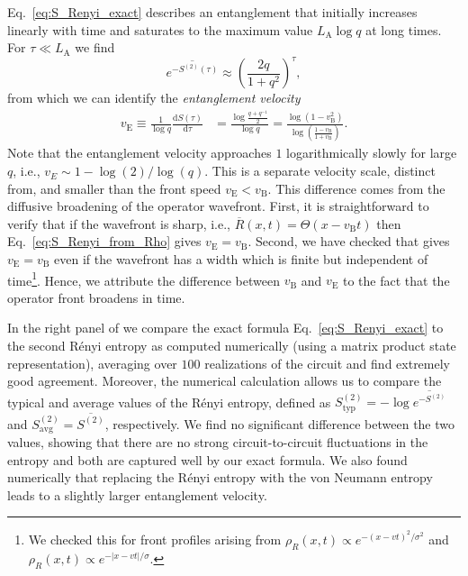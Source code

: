 \documentclass[aps,prb,twocolumn,superscriptaddress]{revtex4-1}
\begin{document}
Eq.~\eqref{eq:S_Renyi_exact} describes an entanglement that initially increases linearly with time and saturates to the maximum value $L_\text{A}\log{q}$ at long times. For $\tau \ll L_\text{A}$ we find
\begin{equation}
\overline{e^{-S^{(2)}(\tau)}} \approx \left( \frac{2q}{1+q^2} \right)^\tau,
\end{equation} 
from which we can identify the \emph{entanglement velocity}
\begin{align}\label{eq:entanglement_velocity}
v_\text{E} \equiv \frac{1}{\log{q}} \frac{\text{d}S(\tau)}{\text{d}\tau} &=\frac{\log \frac{q+q^{-1}}{2}}{\log q} = \frac{\log \left(1-v_{\text{B}}^2\right)}{\log \left(\frac{1-v_{\text{B}}}{1+v_{\text{B}}}\right)}.
\end{align}
Note that the entanglement velocity approaches $1$ logarithmically slowly for large $q$, i.e., $v_E\sim 1- \log(2)/\log(q)$. This is a separate velocity scale, distinct from, and smaller than the front speed $v_\text{E} <v_{\text{B}}$. This difference comes from the diffusive broadening of the operator wavefront.  First, it is straightforward to verify that if the wavefront is sharp, i.e., $\overline{R}(x,t) = \Theta(x-v_{\text{B}}t)$ then Eq.~\eqref{eq:S_Renyi_from_Rho}  gives $v_\text{E} = v_{\text{B}}$. Second, we have checked that  gives $v_\text{E} = v_{\text{B}}$ even if the wavefront has a width which is finite but independent of time\footnote{We checked this for front profiles arising from $\rho_R(x,t) \propto e^{-(x-v t)^2/\sigma^2}$ and $\rho_R(x,t) \propto e^{-|x-v t|/\sigma}$.}. Hence, we attribute the difference between $v_{\text{B}}$ and $v_\text{E}$ to the fact that the operator front broadens in time. 

In the right panel of  we compare the exact formula Eq.~\eqref{eq:S_Renyi_exact} to the second R\'enyi entropy as computed numerically (using a matrix product state representation), averaging over $100$ realizations of the circuit and find extremely good agreement. Moreover, the numerical calculation allows us to compare the typical and average values of the R\'enyi entropy, defined as $S^{(2)}_\text{typ} = -\log{\overline{e^{-S^{(2)}}}}$ and $S^{(2)}_\text{avg} = \overline{S^{(2)}}$, respectively. We find no significant difference between the two values, showing that there are no strong circuit-to-circuit fluctuations in the entropy and both are captured well by our exact formula. We also found numerically that replacing the R\'enyi entropy with the von Neumann entropy leads to a slightly larger entanglement velocity.
\end{document}
